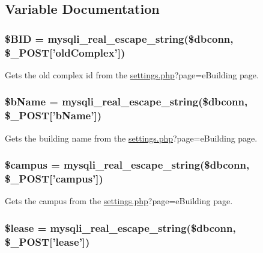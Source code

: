 \subsection{\-Variable \-Documentation}
\hypertarget{upBuildings_8php_a7458cf5c1cfaeb93fe055362ecff999e}{
\subsubsection[{\$\-B\-I\-D}]{\setlength{\rightskip}{0pt plus 5cm}\$\-B\-I\-D = mysqli\-\_\-real\-\_\-escape\-\_\-string(\$dbconn, \$\-\_\-\-P\-O\-S\-T\mbox{[}'old\-Complex'\mbox{]})}}\label{upBuildings_8php_a7458cf5c1cfaeb93fe055362ecff999e}
\-Gets the old complex id from the \hyperlink{settings_8php}{settings.\-php}?page=e\-Building page. \hypertarget{upBuildings_8php_adda32c78f7f7aed9a0f7bb03a9198e9c}{
\subsubsection[{\$b\-Name}]{\setlength{\rightskip}{0pt plus 5cm}\$b\-Name = mysqli\-\_\-real\-\_\-escape\-\_\-string(\$dbconn, \$\-\_\-\-P\-O\-S\-T\mbox{[}'b\-Name'\mbox{]})}}\label{upBuildings_8php_adda32c78f7f7aed9a0f7bb03a9198e9c}
\-Gets the building name from the \hyperlink{settings_8php}{settings.\-php}?page=e\-Building page. \hypertarget{upBuildings_8php_a6f0655994f3941d6ab50f681032f899b}{
\subsubsection[{\$campus}]{\setlength{\rightskip}{0pt plus 5cm}\$campus = mysqli\-\_\-real\-\_\-escape\-\_\-string(\$dbconn, \$\-\_\-\-P\-O\-S\-T\mbox{[}'campus'\mbox{]})}}\label{upBuildings_8php_a6f0655994f3941d6ab50f681032f899b}
\-Gets the campus from the \hyperlink{settings_8php}{settings.\-php}?page=e\-Building page. \hypertarget{upBuildings_8php_ae95126b1133cf958aaf8a31b0283364c}{
\subsubsection[{\$lease}]{\setlength{\rightskip}{0pt plus 5cm}\$lease = mysqli\-\_\-real\-\_\-escape\-\_\-string(\$dbconn, \$\-\_\-\-P\-O\-S\-T\mbox{[}'lease'\mbox{]})}}\label{upBuildings_8php_ae95126b1133cf958aaf8a31b0283364c}
